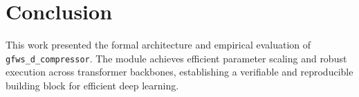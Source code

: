 \section{Conclusion}
This work presented the formal architecture and empirical evaluation of \texttt{gfws_d_compressor}. The module achieves efficient parameter scaling and robust execution across transformer backbones, establishing a verifiable and reproducible building block for efficient deep learning.
